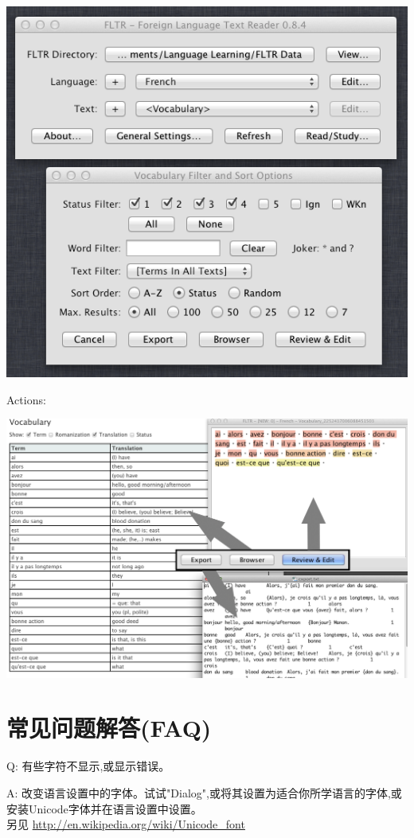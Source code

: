 \documentclass[cn,10pt,math=newtx,citestyle=gb7714-2015,bibstyle=gb7714-2015]{elegantbook}
\begin{document}
\includegraphics[scale=0.6]{image/images-044.png}

Actions:

\includegraphics[scale=0.3]{image/images-045.png}


\chapter{常见问题解答(FAQ)}\label{常见问题解答(FAQ)}
Q:
有些字符不显示,或显示错误。

A:
改变语言设置中的字体。试试"Dialog",或将其设置为适合你所学语言的字体,或安装Unicode字体并在语言设置中设置。\\
另见 \url{http://en.wikipedia.org/wiki/Unicode_font}
\end{document}
